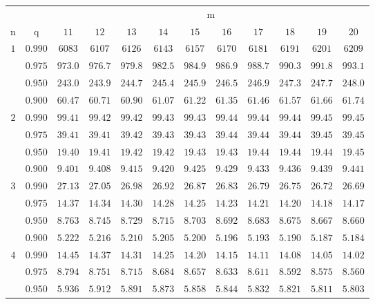 \documentclass[11pt]{article}
\theoremstyle{definition}
\begin{document}
\begin{table}[H]
	\begin{tabularx}{\linewidth}{c | c | c c c c c c c c c c}
		& & \multicolumn{10}{c}{m}\\
		\cline{3-12}
		n & q & $11$ & $12$ & $13$ & $14$ & $15$ & $16$ & $17$ & $18$ & $19$ & $20$\\
		\hline
		$1$ & $0.990$ & $6083$ & $6107$ & $6126$ & $6143$ & $6157$ & $6170$ & $6181$ & $6191$ & $6201$ & $6209$ \\
		& $0.975$ & $973.0$ & $976.7$ & $979.8$ & $982.5$ & $984.9$ & $986.9$ & $988.7$ & $990.3$ & $991.8$ & $993.1$ \\
		& $0.950$ & $243.0$ & $243.9$ & $244.7$ & $245.4$ & $245.9$ & $246.5$ & $246.9$ & $247.3$ & $247.7$ & $248.0$ \\
		& $0.900$ & $60.47$ & $60.71$ & $60.90$ & $61.07$ & $61.22$ & $61.35$ & $61.46$ & $61.57$ & $61.66$ & $61.74$ \\
		$2$ & $0.990$ & $99.41$ & $99.42$ & $99.42$ & $99.43$ & $99.43$ & $99.44$ & $99.44$ & $99.44$ & $99.45$ & $99.45$ \\
		& $0.975$ & $39.41$ & $39.41$ & $39.42$ & $39.43$ & $39.43$ & $39.44$ & $39.44$ & $39.44$ & $39.45$ & $39.45$ \\
		& $0.950$ & $19.40$ & $19.41$ & $19.42$ & $19.42$ & $19.43$ & $19.43$ & $19.44$ & $19.44$ & $19.44$ & $19.45$ \\
		& $0.900$ & $9.401$ & $9.408$ & $9.415$ & $9.420$ & $9.425$ & $9.429$ & $9.433$ & $9.436$ & $9.439$ & $9.441$ \\
		$3$ & $0.990$ & $27.13$ & $27.05$ & $26.98$ & $26.92$ & $26.87$ & $26.83$ & $26.79$ & $26.75$ & $26.72$ & $26.69$ \\
		& $0.975$ & $14.37$ & $14.34$ & $14.30$ & $14.28$ & $14.25$ & $14.23$ & $14.21$ & $14.20$ & $14.18$ & $14.17$ \\
		& $0.950$ & $8.763$ & $8.745$ & $8.729$ & $8.715$ & $8.703$ & $8.692$ & $8.683$ & $8.675$ & $8.667$ & $8.660$ \\
		& $0.900$ & $5.222$ & $5.216$ & $5.210$ & $5.205$ & $5.200$ & $5.196$ & $5.193$ & $5.190$ & $5.187$ & $5.184$ \\
		$4$ & $0.990$ & $14.45$ & $14.37$ & $14.31$ & $14.25$ & $14.20$ & $14.15$ & $14.11$ & $14.08$ & $14.05$ & $14.02$ \\
		& $0.975$ & $8.794$ & $8.751$ & $8.715$ & $8.684$ & $8.657$ & $8.633$ & $8.611$ & $8.592$ & $8.575$ & $8.560$ \\
		& $0.950$ & $5.936$ & $5.912$ & $5.891$ & $5.873$ & $5.858$ & $5.844$ & $5.832$ & $5.821$ & $5.811$ & $5.803$ \\

\end{tabularx}
\end{table}
\end{document}

